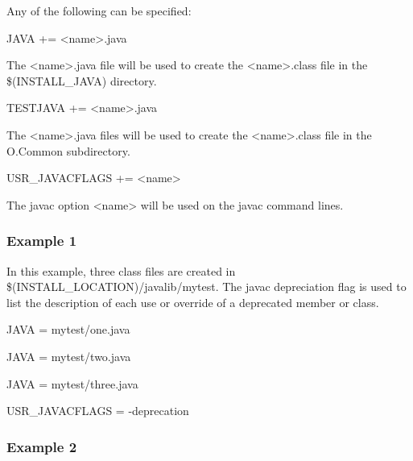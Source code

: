 Any of the following can be specified:

\begin{description}

\item {}JAVA += \textless{}name\textgreater{}.java

The \textless{}name\textgreater{}.java file will be used to create the \textless{}name\textgreater{}.class file in the \$(INSTALL\_JAVA) directory.

\item {}TESTJAVA += \textless{}name\textgreater{}.java

The \textless{}name\textgreater{}.java files will be used to create the \textless{}name\textgreater{}.class file in the O.Common subdirectory.

\item {}USR\_JAVACFLAGS += \textless{}name\textgreater{}

The javac option \textless{}name\textgreater{} will be used on the javac command lines.

\end{description}

\subsubsection{Example 1}

In this example, three class files are created in \$(INSTALL\_LOCATION)/javalib/mytest. The javac depreciation flag is 
used to list the description of each use or override of a deprecated member or class.

\begin{description}

\item {}JAVA = mytest/one.java

\item JAVA = mytest/two.java

\item JAVA = mytest/three.java

\item {}USR\_JAVACFLAGS = -deprecation

\end{description}

\subsubsection{Example 2}

